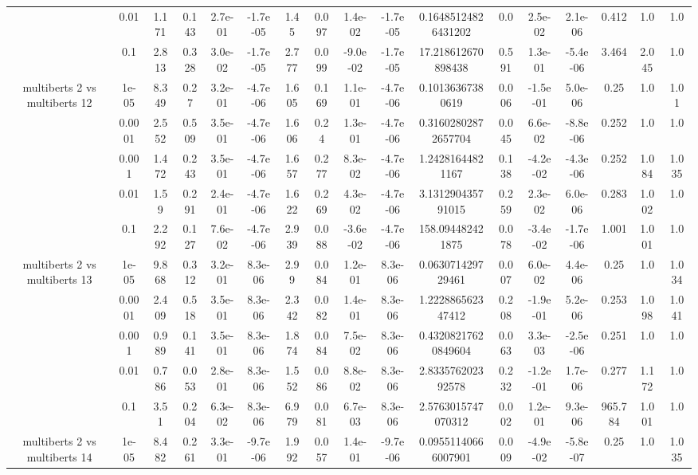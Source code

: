 \begin{tabular}{|c|c|c|c|c|c|c|c|c|c|c|c|c|c|c|c|c|}
 & 0.01 & 1.171 & 0.143 & 2.7e-01 & -1.7e-05 & 1.45 & 0.097 & 1.4e-02 & -1.7e-05 & 0.16485124826431202 & 0.0 & 2.5e-02 & 2.1e-06 & 0.412 & 1.0 & 1.0 \\
 & 0.1 & 2.813 & 0.328 & 3.0e-02 & -1.7e-05 & 2.777 & 0.099 & -9.0e-02 & -1.7e-05 & 17.218612670898438 & 0.591 & 1.3e-01 & -5.4e-06 & 3.464 & 2.045 & 1.0 \\
\hline
\multirow{5}{*}{multiberts 2 vs multiberts 12} & 1e-05 & 8.349 & 0.27 & 3.2e-01 & -4.7e-06 & 1.605 & 0.169 & 1.1e-01 & -4.7e-06 & 0.10136367380619 & 0.006 & -1.5e-01 & 5.0e-06 & 0.25 & 1.0 & 1.01 \\
 & 0.0001 & 2.552 & 0.509 & 3.5e-01 & -4.7e-06 & 1.606 & 0.24 & 1.3e-01 & -4.7e-06 & 0.31602802872657704 & 0.045 & 6.6e-02 & -8.8e-06 & 0.252 & 1.0 & 1.0 \\
 & 0.001 & 1.472 & 0.243 & 3.5e-01 & -4.7e-06 & 1.657 & 0.277 & 8.3e-02 & -4.7e-06 & 1.24281644821167 & 0.138 & -4.2e-02 & -4.3e-06 & 0.252 & 1.084 & 1.035 \\
 & 0.01 & 1.59 & 0.291 & 2.4e-01 & -4.7e-06 & 1.622 & 0.269 & 4.3e-02 & -4.7e-06 & 3.131290435791015 & 0.259 & 2.3e-02 & 6.0e-06 & 0.283 & 1.002 & 1.0 \\
 & 0.1 & 2.292 & 0.127 & 7.6e-02 & -4.7e-06 & 2.939 & 0.088 & -3.6e-02 & -4.7e-06 & 158.094482421875 & 0.078 & -3.4e-02 & -1.7e-06 & 1.001 & 1.001 & 1.0 \\
\hline
\multirow{5}{*}{multiberts 2 vs multiberts 13} & 1e-05 & 9.868 & 0.312 & 3.2e-01 & 8.3e-06 & 2.99 & 0.084 & 1.2e-01 & 8.3e-06 & 0.063071429729461 & 0.007 & 6.0e-02 & 4.4e-06 & 0.25 & 1.0 & 1.034 \\
 & 0.0001 & 2.409 & 0.518 & 3.5e-01 & 8.3e-06 & 2.342 & 0.082 & 1.4e-01 & 8.3e-06 & 1.222886562347412 & 0.208 & -1.9e-01 & 5.2e-06 & 0.253 & 1.098 & 1.041 \\
 & 0.001 & 0.989 & 0.141 & 3.5e-01 & 8.3e-06 & 1.874 & 0.084 & 7.5e-02 & 8.3e-06 & 0.43208217620849604 & 0.063 & 3.3e-03 & -2.5e-06 & 0.251 & 1.0 & 1.0 \\
 & 0.01 & 0.786 & 0.053 & 2.8e-01 & 8.3e-06 & 1.552 & 0.086 & 8.8e-02 & 8.3e-06 & 2.833576202392578 & 0.232 & -1.2e-01 & 1.7e-06 & 0.277 & 1.172 & 1.0 \\
 & 0.1 & 3.51 & 0.204 & 6.3e-02 & 8.3e-06 & 6.979 & 0.081 & 6.7e-03 & 8.3e-06 & 2.5763015747070312 & 0.002 & 1.2e-01 & 9.3e-06 & 965.784 & 1.001 & 1.0 \\
\hline
\multirow{5}{*}{multiberts 2 vs multiberts 14} & 1e-05 & 8.482 & 0.261 & 3.3e-01 & -9.7e-06 & 1.992 & 0.057 & 1.4e-01 & -9.7e-06 & 0.09551140666007901 & 0.009 & -4.9e-02 & -5.8e-07 & 0.25 & 1.0 & 1.035 \\

\end{tabular}
